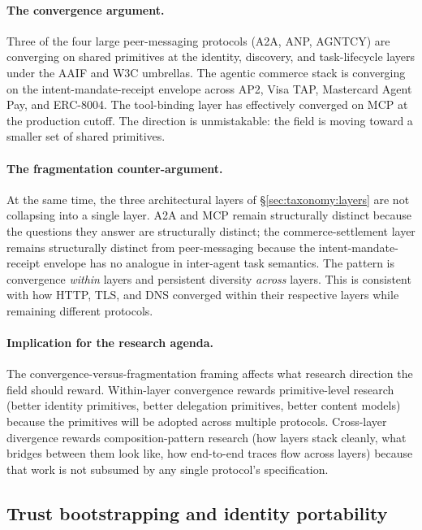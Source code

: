 \paragraph{The convergence argument.}
Three of the four large peer-messaging protocols (A2A,
ANP, AGNTCY) are converging on shared primitives at the
identity, discovery, and task-lifecycle layers under
the AAIF and W3C umbrellas. The agentic commerce stack
is converging on the intent-mandate-receipt envelope
across AP2, Visa TAP, Mastercard Agent Pay, and
ERC-8004. The tool-binding layer has effectively
converged on MCP at the production cutoff. The
direction is unmistakable: the field is moving toward
a smaller set of shared primitives.

\paragraph{The fragmentation counter-argument.}
At the same time, the three architectural layers of
\S\ref{sec:taxonomy:layers} are not collapsing into a
single layer. A2A and MCP remain structurally distinct
because the questions they answer are structurally
distinct; the commerce-settlement layer remains
structurally distinct from peer-messaging because the
intent-mandate-receipt envelope has no analogue in
inter-agent task semantics. The pattern is convergence
\emph{within} layers and persistent diversity
\emph{across} layers. This is consistent with how
HTTP, TLS, and DNS converged within their respective
layers while remaining different protocols.

\paragraph{Implication for the research agenda.}
The convergence-versus-fragmentation framing affects
what research direction the field should reward.
Within-layer convergence rewards primitive-level
research (better identity primitives, better
delegation primitives, better content models)
because the primitives will be adopted across
multiple protocols. Cross-layer divergence rewards
composition-pattern research (how layers stack
cleanly, what bridges between them look like, how
end-to-end traces flow across layers) because that
work is not subsumed by any single protocol's
specification.

\subsection{Trust bootstrapping and identity portability}
\label{sec:openproblems:trust}

